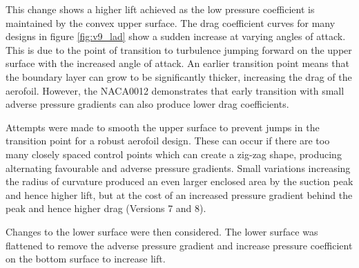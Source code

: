 \documentclass{article}
\begin{document}
This change shows a higher lift achieved as the low pressure coefficient is maintained by the convex upper surface.
The drag coefficient curves for many designs in figure \ref{fig:v9_lad} show a sudden increase at varying angles of attack.
This is due to the point of transition to turbulence jumping forward on the upper surface with the increased angle of attack.
An earlier transition point means that the boundary layer can grow to be significantly thicker, increasing the drag of the aerofoil.
However, the NACA0012 demonstrates that early transition with small adverse pressure gradients can also produce lower drag coefficients.

Attempts were made to smooth the upper surface to prevent jumps in the transition point for a robust aerofoil design.
These can occur if there are too many closely spaced control points which can create a zig-zag shape, producing alternating favourable and adverse pressure gradients.
Small variations increasing the radius of curvature produced an even larger enclosed area by the suction peak and hence higher lift,
but at the cost of an increased pressure gradient behind the peak and hence higher drag (Versions 7 and 8).

Changes to the lower surface were then considered.
The lower surface was flattened to remove the adverse pressure gradient and increase pressure coefficient on the bottom surface to increase lift.
\end{document}

